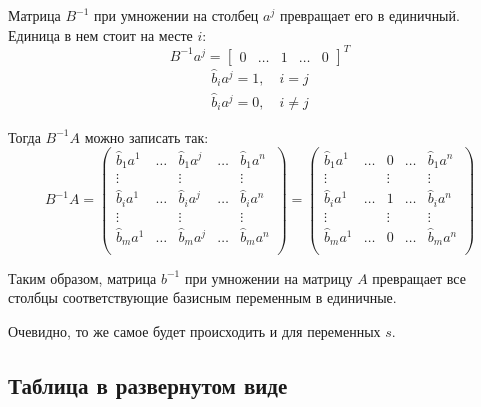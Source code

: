 \documentclass[a4paper,article,14pt]{extarticle}
\begin{document}
Матрица \(B^{-1}\) при умножении на столбец \(a^j\) превращает его в единичный.
Единица в нем стоит на месте \(i\):
\begin{equation}
    B^{-1}a^j = \begin{bmatrix}
        0 & \ldots & 1 & \ldots & 0
    \end{bmatrix} ^T
\end{equation}
\begin{equation}
    \begin{gathered}
        \hat b_i a^j = 1, \quad i = j \\
        \hat b_i a^j = 0, \quad i \ne j
    \end{gathered}
\end{equation}

Тогда \(B^{-1}A\) можно записать так:
\begin{equation}
    B^{-1}A =
    \begin{pmatrix}
        \hat b_1a^1 & \ldots & \hat b_1a^j & \ldots & \hat b_1a^n \\
        \vdots & & \vdots & & \vdots \\
        \hat b_ia^1 & \ldots & \hat b_ia^j & \ldots & \hat b_ia^n \\
        \vdots & & \vdots & & \vdots \\
        \hat b_ma^1 & \ldots & \hat b_ma^j & \ldots & \hat b_ma^n \\
    \end{pmatrix}
    =
    \begin{pmatrix}
        \hat b_1a^1 & \ldots & 0 & \ldots & \hat b_1a^n \\
        \vdots & & \vdots & & \vdots \\
        \hat b_ia^1 & \ldots & 1 & \ldots & \hat b_ia^n \\
        \vdots & & \vdots & & \vdots \\
        \hat b_ma^1 & \ldots & 0 & \ldots & \hat b_ma^n \\
    \end{pmatrix}
\end{equation}

Таким образом, матрица \(b^{-1}\) при умножении на матрицу \(A\) превращает все столбцы соответствующие базисным переменным в единичные.

Очевидно, то же самое будет происходить и для переменных \(s\).

\subsection{Таблица в развернутом виде}
\end{document}
